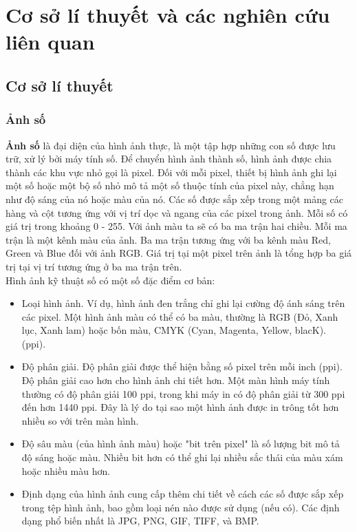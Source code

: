 \documentclass[a4paper,14pt]{extreport}
\begin{document}
\chapter{Cơ sở lí thuyết và các nghiên cứu liên quan}
\section{Cơ sở lí thuyết}
\subsection{Ảnh số}
\textbf{Ảnh số} là đại diện của hình ảnh thực, là một tập hợp những con số được lưu trữ, xử lý bởi máy tính số. Để chuyển hình ảnh thành số, hình ảnh được chia thành các khu vực nhỏ gọi là pixel. Đối với mỗi pixel, thiết bị hình ảnh ghi lại một số hoặc một bộ số nhỏ mô tả một số thuộc tính của pixel này, chẳng hạn như độ sáng của nó hoặc màu của nó. Các số được sắp xếp trong một mảng các hàng và cột tương ứng với vị trí dọc và ngang của các pixel trong ảnh.\cite{img-defi} Mỗi số có giá trị trong khoảng 0 - 255. Với ảnh màu ta sẽ có ba ma trận hai chiều. Mỗi ma trận là một kênh màu của ảnh. Ba ma trận tương ứng với ba kênh màu Red, Green và Blue đối với ảnh RGB. Giá trị tại một pixel trên ảnh là tổng hợp ba giá trị tại vị trí tương ứng ở ba ma trận trên.  
\\
Hình ảnh kỹ thuật số có một số đặc điểm cơ bản:

\begin{itemize}
    \item Loại hình ảnh. Ví dụ, hình ảnh đen trắng chỉ ghi lại cường độ ánh sáng trên các pixel. Một hình ảnh màu có thể có ba màu, thường là RGB (Đỏ, Xanh lục, Xanh lam) hoặc bốn màu, CMYK (Cyan, Magenta, Yellow, blacK). (ppi).\cite{img-defi}
    \item Độ phân giải. Độ phân giải được thể hiện bằng số pixel trên mỗi inch (ppi). Độ phân giải cao hơn cho hình ảnh chi tiết hơn. Một màn hình máy tính thường có độ phân giải 100 ppi, trong khi máy in có độ phân giải từ 300 ppi đến hơn 1440 ppi. Đây là lý do tại sao một hình ảnh được in trông tốt hơn nhiều so với trên màn hình.\cite{img-defi}
    \item Độ sâu màu (của hình ảnh màu) hoặc "bit trên pixel" là số lượng bit mô tả độ sáng hoặc màu. Nhiều bit hơn có thể ghi lại nhiều sắc thái của màu xám hoặc nhiều màu hơn.\cite{img-defi}
    \item Định dạng của hình ảnh cung cấp thêm chi tiết về cách các số được sắp xếp trong tệp hình ảnh, bao gồm loại nén nào được sử dụng (nếu có). Các định dạng phổ biến nhất là JPG, PNG, GIF, TIFF, và BMP.\cite{img-defi}
\end{itemize}
\end{document}
